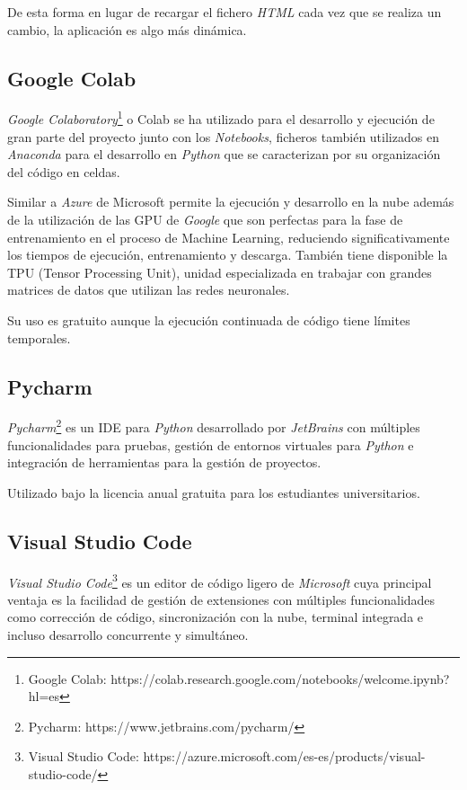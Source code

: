 De esta forma en lugar de recargar el fichero \emph{HTML} cada vez que se realiza un cambio, la aplicación es algo más dinámica.

\subsection{Google Colab}
\emph{Google Colaboratory}\footnote{Google Colab: https://colab.research.google.com/notebooks/welcome.ipynb?hl=es} o Colab se ha utilizado para el desarrollo y ejecución de gran parte del proyecto junto con los \emph{Notebooks}, ficheros también utilizados en \emph{Anaconda} para el desarrollo en \emph{Python} que se caracterizan por su organización del código en celdas.

Similar a \emph{Azure} de Microsoft permite la ejecución y desarrollo en la nube además de la utilización de las GPU de \emph{Google} que son perfectas para la fase de entrenamiento en el proceso de Machine Learning, reduciendo significativamente los tiempos de ejecución, entrenamiento y descarga. También tiene disponible la TPU (Tensor Processing Unit), unidad especializada en trabajar con grandes matrices de datos que utilizan las redes neuronales.

Su uso es gratuito aunque la ejecución continuada de código tiene límites temporales.

\subsection{Pycharm}
\emph{Pycharm}\footnote{Pycharm: https://www.jetbrains.com/pycharm/} es un IDE para \emph{Python} desarrollado por \emph{JetBrains} con múltiples funcionalidades para pruebas, gestión de entornos virtuales para \emph{Python} e integración de herramientas para la gestión de proyectos.

Utilizado bajo la licencia anual gratuita para los estudiantes universitarios.

\subsection{Visual Studio Code}
\emph{Visual Studio Code}\footnote{Visual Studio Code: https://azure.microsoft.com/es-es/products/visual-studio-code/} es un editor de código ligero de \emph{Microsoft} cuya principal ventaja es la facilidad de gestión de extensiones con múltiples funcionalidades como corrección de código, sincronización con la nube, terminal integrada e incluso desarrollo concurrente y simultáneo.

